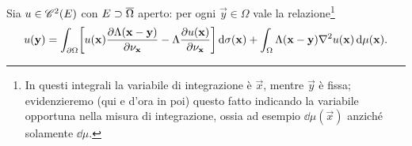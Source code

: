 \begin{teorema} \label{t:rappresentazione-green}
    Sia $u\in\cont[2]{E}$ con $E\supset\clos{\Omega}$ aperto: per ogni $\vec y\in\Omega$ vale la relazione\footnote{
        In questi integrali la variabile di integrazione è $\vec x$, mentre $\vec y$ è fissa; evidenzieremo (qui e d'ora in poi) questo fatto indicando la variabile opportuna nella misura di integrazione, ossia ad esempio $\dd\mu(\vec x)$ anzich\'e solamente $\dd\mu$.
    }
    \begin{equation}
        u(\vec y)=
        \int_{\boundary\Omega} \biggl[u(\vec x)\drp{\sfl(\vec x-\vec y)}{\nu_\vec{x}}-\sfl\drp{u(\vec x)}{\nu_\vec{x}}\biggr]\,\dd\sigma(\vec x)+
        \int_\Omega \sfl(\vec x-\vec y)\lap u(\vec x)\,\dd\mu(\vec x).
        \label{eq:rappresentazione-green}
    \end{equation}
\end{teorema}

